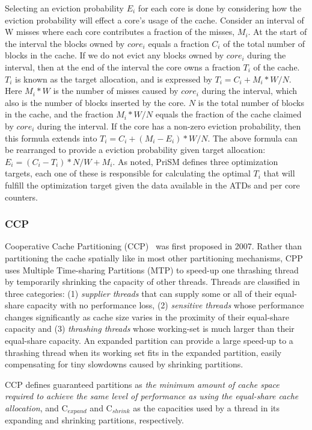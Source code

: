 Selecting an eviction probability $E_i$ for each core is done by considering how the eviction probability will effect a core's usage of the cache.
Consider an interval of W misses where each core contributes a fraction of the misses, $M_i$.
At the start of the interval the blocks owned by $core_i$ equals a fraction $C_i$ of the total number of blocks in the cache.
If we do not evict any blocks owned by $core_i$ during the interval, then at the end of the interval the core owns a fraction $T_i$ of the cache.
$T_i$ is known as the target allocation, and is expressed by $T_i = C_i + M_i * W/N$. 
Here $M_i * W$ is the number of misses caused by $core_i$ during the interval, which also is the number of blocks inserted by the core.
$N$ is the total number of blocks in the cache, and the fraction $M_i * W/N$ equals the fraction of the cache claimed by $core_i$ during the interval.
If the core has a non-zero eviction probability, then this formula extends into $T_i = C_i + (M_i - E_i) * W/N$.
The above formula can be rearranged to provide a eviction probability given target allocation: $E_i = (C_i - T_i) * N/W + M_i$.
As noted, PriSM defines three optimization targets, each one of these is responsible for calculating the optimal $T_i$ that will fulfill the optimization target given the data available in the ATDs and per core counters.

\subsubsection{CCP}

Cooperative Cache Partitioning (CCP)~\cite{cooperativeCachePartitioning} was first proposed in 2007. 
Rather than partitioning the cache spatially like in most other partitioning mechanisms, CPP uses Multiple Time-sharing Partitions (MTP) to speed-up one thrashing thread by temporarily shrinking the capacity of other threads. 
Threads are classified in three categories: (1) \textit{supplier threads} that can supply some or all of their equal-share capacity with no performance loss, (2) \textit{sensitive threads} whose performance changes significantly as cache size varies in the proximity of their equal-share capacity and (3) \textit{thrashing threads} whose working-set is much larger than their equal-share capacity.
An expanded partition can provide a large speed-up to a thrashing thread when its working set fits in the expanded partition, easily compensating for tiny slowdowns caused by shrinking partitions. 

CCP defines guaranteed partitions as \textit{the minimum amount of cache space required to achieve the same level of performance as using the equal-share cache allocation}, and C$_{expand}$ and C$_{shrink}$ as the capacities used by a thread in its expanding and shrinking partitions, respectively. 

